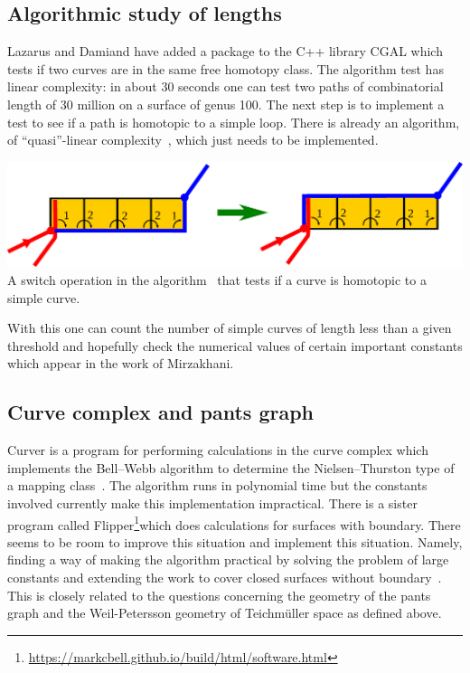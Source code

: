 \documentclass[14pt,fleqn]{article}
\begin{document}
\subsection{Algorithmic study of lengths}

Lazarus and Damiand have
added a package to the C++ library  CGAL which tests if two curves are
in the same free homotopy class. The algorithm test has linear
complexity: in about 30 seconds one can test two paths of
combinatorial length of 30 million on a surface of genus
100. The next step is to implement a test to see if a path
is homotopic to a simple loop. There is already an algorithm, of
“quasi”-linear complexity~\cite{dl-cginc-19}, which just needs to be implemented.
\begin{center}
  \includegraphics[scale=.55]{switch.pdf} \\
  {\small A switch operation in the algorithm~\cite{dl-cginc-19} that tests if a curve is homotopic to a simple curve.}
\end{center}
With
this one can count the number of simple curves of length less than a given threshold 
and hopefully check the numerical values of certain important constants which
appear in the work of Mirzakhani.



\subsection{Curve complex and pants graph}

Curver is a program for
performing calculations in the curve complex which implements the
Bell–Webb algorithm to determine the Nielsen–Thurston type of a
mapping class~\cite{b-c-17,b-esmt-19}. The algorithm runs in polynomial time but the constants
involved currently make this implementation impractical. There is a
sister program called Flipper\footnote{\url{https://markcbell.github.io/build/html/software.html}}which does calculations for surfaces
with boundary. There seems to be room to improve this situation and
implement this situation. Namely, finding a way of making the
algorithm practical by solving the problem of large constants and
extending the work to cover closed surfaces without boundary~\cite{mm-sosr-19}.
This is closely related to the questions 
concerning the geometry 
of the pants graph and the Weil-Petersson geometry of Teichm\"uller space
as defined above.
\end{document}
